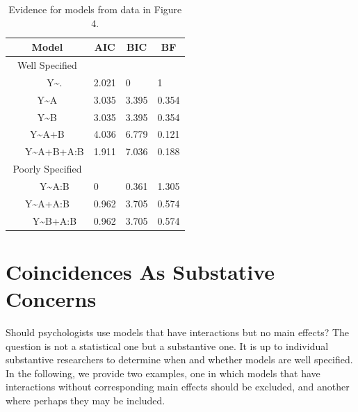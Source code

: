 \documentclass[
  english,
  ,man]{apa6}
\begin{document}
\begin{table}[tbp]

\begin{center}
\begin{threeparttable}

\caption{\label{tab:assessInterT}Evidence for models from data in Figure 4.}

\begin{tabular}{clll}
\toprule
Model & \multicolumn{1}{c}{AIC} & \multicolumn{1}{c}{BIC} & \multicolumn{1}{c}{BF}\\
\midrule
Well Specified &  &  & \\
\ \ \ Y\textasciitilde{}. & 2.021 & 0 & 1\\
Y\textasciitilde{}A & 3.035 & 3.395 & 0.354\\
Y\textasciitilde{}B & 3.035 & 3.395 & 0.354\\
Y\textasciitilde{}A+B & 4.036 & 6.779 & 0.121\\
\ \ \ Y\textasciitilde{}A+B+A:B & 1.911 & 7.036 & 0.188\\ \midrule
Poorly Specified &  &  & \\
\ \ \ Y\textasciitilde{}A:B & 0 & 0.361 & 1.305\\
Y\textasciitilde{}A+A:B & 0.962 & 3.705 & 0.574\\
\ \ \ Y\textasciitilde{}B+A:B & 0.962 & 3.705 & 0.574\\
\bottomrule
\end{tabular}

\end{threeparttable}
\end{center}

\end{table}

\hypertarget{coincidences-as-substative-concerns}{%
\section{Coincidences As Substative Concerns}\label{coincidences-as-substative-concerns}}

Should psychologists use models that have interactions but no main effects? The question is not a statistical one but a substantive one. It is up to individual substantive researchers to determine when and whether models are well specified. In the following, we provide two examples, one in which models that have interactions without corresponding main effects should be excluded, and another where perhaps they may be included.
\end{document}
